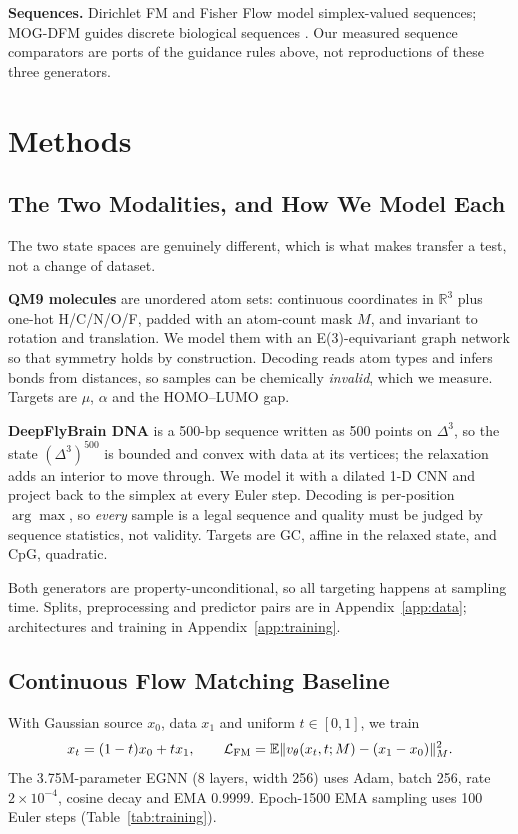 \documentclass{article}
\begin{document}
\textbf{Sequences.} Dirichlet FM and Fisher Flow model simplex-valued sequences; MOG-DFM guides discrete biological sequences \citep{stark2024dirichlet,davis2024fisher,chen2025multi}. Our measured sequence comparators are ports of the guidance rules above, not reproductions of these three generators.

\section{Methods}
\subsection{The Two Modalities, and How We Model Each}\label{sec:data}
The two state spaces are genuinely different, which is what makes transfer a test, not a change of dataset.

\textbf{QM9 molecules} are unordered atom sets: continuous coordinates in $\mathbb R^3$ plus one-hot H/C/N/O/F, padded with an atom-count mask $M$, and invariant to rotation and translation. We model them with an E(3)-equivariant graph network so that symmetry holds by construction. Decoding reads atom types and infers bonds from distances, so samples can be chemically \emph{invalid}, which we measure. Targets are $\mu$, $\alpha$ and the HOMO--LUMO gap.

\textbf{DeepFlyBrain DNA} is a 500-bp sequence written as 500 points on $\Delta^3$, so the state $(\Delta^3)^{500}$ is bounded and convex with data at its vertices; the relaxation adds an interior to move through. We model it with a dilated 1-D CNN and project back to the simplex at every Euler step. Decoding is per-position $\arg\max$, so \emph{every} sample is a legal sequence and quality must be judged by sequence statistics, not validity. Targets are GC, affine in the relaxed state, and CpG, quadratic.

Both generators are property-unconditional, so all targeting happens at sampling time. Splits, preprocessing and predictor pairs are in Appendix~\ref{app:data}; architectures and training in Appendix~\ref{app:training}.

\subsection{Continuous Flow Matching Baseline}\label{sec:fm}
With Gaussian source $x_0$, data $x_1$ and uniform $t\in[0,1]$, we train
\begin{equation}
x_t=(1-t)x_0+tx_1,\qquad \mathcal L_{\rm FM}=\mathbb E\|v_\theta(x_t,t;M)-(x_1-x_0)\|_M^2.
\label{eq:fm}
\end{equation}
The 3.75M-parameter EGNN (8 layers, width 256) uses Adam, batch 256, rate $2\times10^{-4}$, cosine decay and EMA 0.9999. Epoch-1500 EMA sampling uses 100 Euler steps (Table~\ref{tab:training}).
\end{document}
